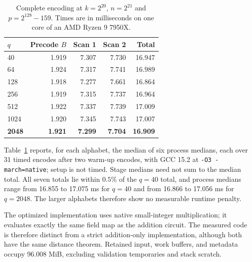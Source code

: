 \begin{table}[t]
\centering
\caption{Complete encoding at $k=2^{20}$, $n=2^{21}$ and
$p=2^{128}-159$. Times are in milliseconds on one core of an
AMD Ryzen 9 7950X.}
\label{tab:small-timing}
\begin{tabular}{lrrrr}
\toprule
$q$ & Precode $B$ & Scan 1 & Scan 2 & Total\\
\midrule
40 & 1.919 & 7.307 & 7.730 & 16.947\\
64 & 1.924 & 7.317 & 7.741 & 16.989\\
128 & 1.918 & 7.277 & 7.661 & 16.864\\
256 & 1.919 & 7.315 & 7.737 & 16.964\\
512 & 1.922 & 7.337 & 7.739 & 17.009\\
1024 & 1.920 & 7.345 & 7.743 & 17.007\\
\textbf{2048} & \textbf{1.921} & \textbf{7.299} & \textbf{7.704} & \textbf{16.909}\\
\bottomrule
\end{tabular}
\end{table}

Table~\ref{tab:small-timing} reports, for each alphabet, the median of
six process medians, each over 31 timed encodes after two warm-up
encodes, with GCC 15.2 at \texttt{-O3 -march=native}; setup is not timed.
Stage medians need not sum to the median total. All seven totals lie
within $0.5\%$ of the $q=40$ total, and process medians range from
16.855 to 17.075 ms for $q=40$ and from 16.866 to 17.056 ms for
$q=2048$. The larger alphabets therefore show no measurable runtime
penalty.

The optimized implementation uses native small-integer multiplication;
it evaluates exactly the same field map as the addition circuit. The
measured code is therefore distinct from a strict addition-only
implementation, although both have the same distance theorem. Retained
input, work buffers, and metadata occupy
96.008 MiB, excluding validation temporaries and stack scratch.
